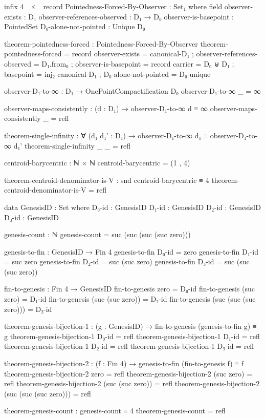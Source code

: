 \documentclass[11pt,a4paper]{book}
\begin{document}
\begin{code}
infix 4 _≤_
record Pointedness-Forced-By-Observer : Set₁ where
  field
    observer-exists : D₁
    observer-references-observed : D₁ → D₀
    observer-is-basepoint : PointedSet
    D₀-alone-not-pointed : Unique D₀

theorem-pointedness-forced : Pointedness-Forced-By-Observer
theorem-pointedness-forced = record
  { observer-exists = canonical-D₁
  ; observer-references-observed = D₁.from₀
  ; observer-is-basepoint = record 
      { carrier = D₀ ⊎ D₁
      ; basepoint = inj₂ canonical-D₁
      }
  ; D₀-alone-not-pointed = D₀-unique
  }

observer-D₁-to-∞ : D₁ → OnePointCompactification D₀
observer-D₁-to-∞ _ = ∞

observer-maps-consistently : (d : D₁) → observer-D₁-to-∞ d ≡ ∞
observer-maps-consistently _ = refl

theorem-single-infinity : ∀ (d₁ d₁' : D₁) → observer-D₁-to-∞ d₁ ≡ observer-D₁-to-∞ d₁'
theorem-single-infinity _ _ = refl

centroid-barycentric : ℕ × ℕ
centroid-barycentric = (1 , 4)

theorem-centroid-denominator-is-V : snd centroid-barycentric ≡ 4
theorem-centroid-denominator-is-V = refl


data GenesisID : Set where
  D₀-id : GenesisID
  D₁-id : GenesisID
  D₂-id : GenesisID
  D₃-id : GenesisID

genesis-count : ℕ
genesis-count = suc (suc (suc (suc zero)))

genesis-to-fin : GenesisID → Fin 4
genesis-to-fin D₀-id = zero
genesis-to-fin D₁-id = suc zero
genesis-to-fin D₂-id = suc (suc zero)
genesis-to-fin D₃-id = suc (suc (suc zero))

fin-to-genesis : Fin 4 → GenesisID
fin-to-genesis zero = D₀-id
fin-to-genesis (suc zero) = D₁-id
fin-to-genesis (suc (suc zero)) = D₂-id
fin-to-genesis (suc (suc (suc zero))) = D₃-id

theorem-genesis-bijection-1 : (g : GenesisID) → fin-to-genesis (genesis-to-fin g) ≡ g
theorem-genesis-bijection-1 D₀-id = refl
theorem-genesis-bijection-1 D₁-id = refl
theorem-genesis-bijection-1 D₂-id = refl
theorem-genesis-bijection-1 D₃-id = refl

theorem-genesis-bijection-2 : (f : Fin 4) → genesis-to-fin (fin-to-genesis f) ≡ f
theorem-genesis-bijection-2 zero = refl
theorem-genesis-bijection-2 (suc zero) = refl
theorem-genesis-bijection-2 (suc (suc zero)) = refl
theorem-genesis-bijection-2 (suc (suc (suc zero))) = refl

theorem-genesis-count : genesis-count ≡ 4
theorem-genesis-count = refl


\end{code}
\end{document}
